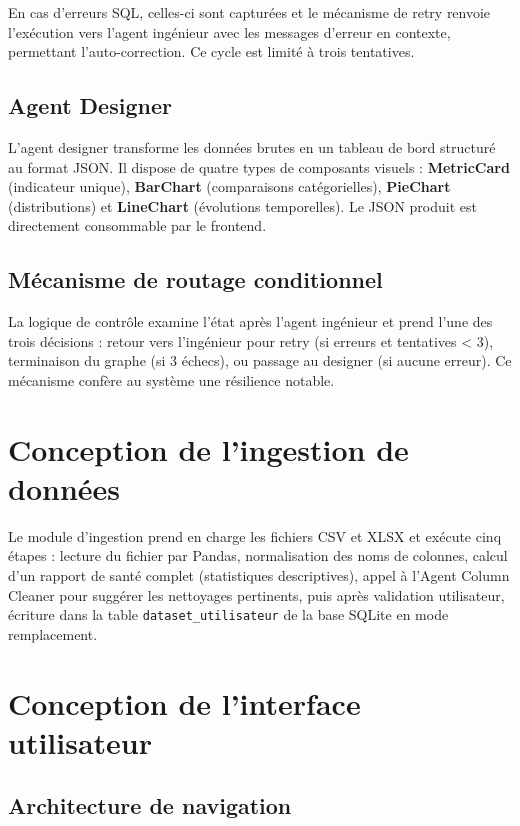 En cas d'erreurs SQL, celles-ci sont capturées et le mécanisme de retry renvoie l'exécution vers l'agent ingénieur avec les messages d'erreur en contexte, permettant l'auto-correction. Ce cycle est limité à trois tentatives.

\subsection{Agent Designer}

L'agent designer transforme les données brutes en un tableau de bord structuré au format JSON. Il dispose de quatre types de composants visuels : \textbf{MetricCard} (indicateur unique), \textbf{BarChart} (comparaisons catégorielles), \textbf{PieChart} (distributions) et \textbf{LineChart} (évolutions temporelles). Le JSON produit est directement consommable par le frontend.

\subsection{Mécanisme de routage conditionnel}

La logique de contrôle examine l'état après l'agent ingénieur et prend l'une des trois décisions : retour vers l'ingénieur pour retry (si erreurs et tentatives < 3), terminaison du graphe (si 3 échecs), ou passage au designer (si aucune erreur). Ce mécanisme confère au système une résilience notable.

\section{Conception de l'ingestion de données}

Le module d'ingestion prend en charge les fichiers CSV et XLSX et exécute cinq étapes : lecture du fichier par Pandas, normalisation des noms de colonnes, calcul d'un rapport de santé complet (statistiques descriptives), appel à l'Agent Column Cleaner pour suggérer les nettoyages pertinents, puis après validation utilisateur, écriture dans la table \texttt{dataset\_utilisateur} de la base SQLite en mode remplacement.

\section{Conception de l'interface utilisateur}

\subsection{Architecture de navigation}

